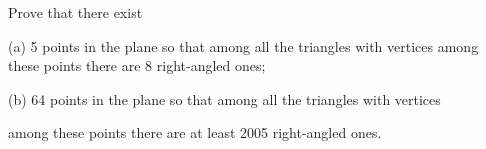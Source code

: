 Prove that there exist

(a) 5 points in the plane so that among all the triangles with vertices among these points there are 8 right-angled ones;

(b) 64 points in the plane so that among all the triangles with vertices

 among these points there are at least 2005 right-angled ones.